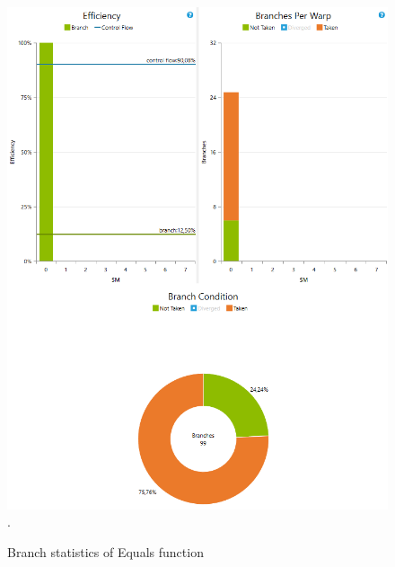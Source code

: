 \documentclass[oneside,openright,12pt,final,en]{mgr}
\begin{document}
\begin{figure}[H]
	\centering
	\includegraphics[width=\textwidth]{equals_branch}.
	\caption{Branch statistics of Equals function}
	\label{fig:equals_branch}
\end{figure}
\end{document}
